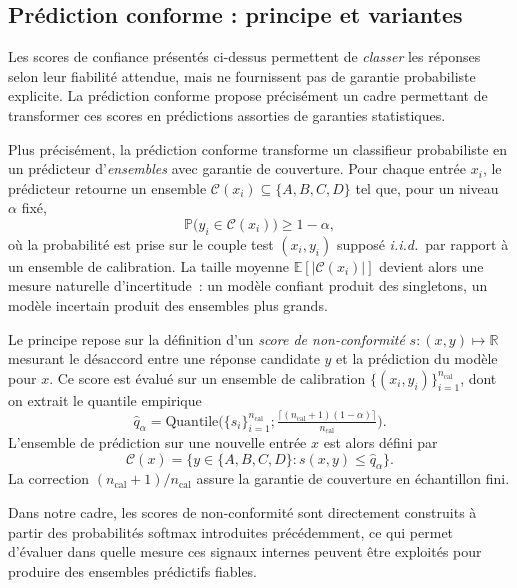 \documentclass[12pt,a4paper]{article}
\begin{document}
\subsection{Prédiction conforme : principe et variantes}

Les scores de confiance présentés ci-dessus permettent de \emph{classer} les réponses selon leur fiabilité attendue, mais ne fournissent pas de garantie probabiliste explicite. La prédiction conforme \citep{angelopoulos2023} propose précisément un cadre permettant de transformer ces scores en prédictions assorties de garanties statistiques.

Plus précisément, la prédiction conforme transforme un classifieur probabiliste en un prédicteur d'\emph{ensembles} avec garantie de couverture. Pour chaque entrée $x_i$, le prédicteur retourne un ensemble $\mathcal{C}(x_i) \subseteq \{A,B,C,D\}$ tel que, pour un niveau $\alpha$ fixé,
\[
\mathbb{P}\big(y_i \in \mathcal{C}(x_i)\big) \geq 1 - \alpha,
\]
où la probabilité est prise sur le couple test $(x_i, y_i)$ supposé \textit{i.i.d.}\ par rapport à un ensemble de calibration. La taille moyenne $\mathbb{E}[|\mathcal{C}(x_i)|]$ devient alors une mesure naturelle d'incertitude~: un modèle confiant produit des singletons, un modèle incertain produit des ensembles plus grands.

Le principe repose sur la définition d’un \emph{score de non-conformité} $s : (x, y) \mapsto \mathbb{R}$ mesurant le désaccord entre une réponse candidate $y$ et la prédiction du modèle pour $x$. Ce score est évalué sur un ensemble de calibration $\{(x_i, y_i)\}_{i=1}^{n_{\text{cal}}}$, dont on extrait le quantile empirique
\[
\hat{q}_{\alpha} = \text{Quantile}\Big(\{s_i\}_{i=1}^{n_{\text{cal}}}; \tfrac{\lceil (n_{\text{cal}}+1)(1-\alpha)\rceil}{n_{\text{cal}}}\Big).
\]
L'ensemble de prédiction sur une nouvelle entrée $x$ est alors défini par
\[
\mathcal{C}(x) = \{y \in \{A,B,C,D\} : s(x, y) \leq \hat{q}_\alpha\}.
\]
La correction $(n_{\text{cal}}+1)/n_{\text{cal}}$ assure la garantie de couverture en échantillon fini.

Dans notre cadre, les scores de non-conformité sont directement construits à partir des probabilités softmax introduites précédemment, ce qui permet d’évaluer dans quelle mesure ces signaux internes peuvent être exploités pour produire des ensembles prédictifs fiables.
\end{document}
